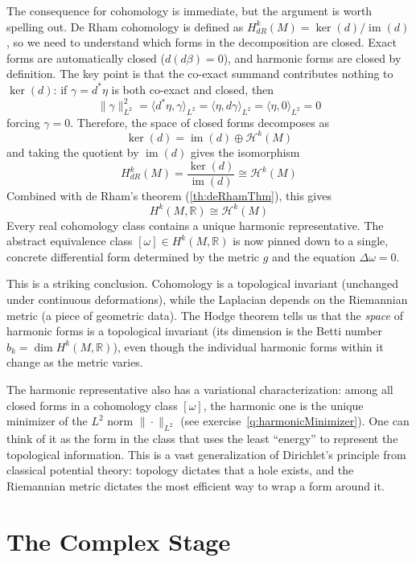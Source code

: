 \documentclass{article}
\newcommand{\R}{\mathbb{R}}
\newcommand{\CH}{\mathcal{H}}
\newcommand{\im}{\operatorname{im}}
\begin{document}
The consequence for cohomology is immediate, but the argument is worth spelling
out. De Rham cohomology is defined as $H^k_{dR}(M) = \ker(d) / \im(d)$, so we
need to understand which forms in the decomposition are closed. Exact forms are
automatically closed ($d(d\beta) = 0$), and harmonic forms are closed by
definition. The key point is that the co-exact summand contributes nothing to
$\ker(d)$: if $\gamma = d^*\eta$ is both co-exact and closed, then
\[
  \|\gamma\|^2_{L^2}
    = \langle d^*\eta, \gamma \rangle_{L^2}
    = \langle \eta, d\gamma \rangle_{L^2}
    = \langle \eta, 0 \rangle_{L^2} = 0
\]
forcing $\gamma = 0$. Therefore, the space of closed forms decomposes as
\[
  \ker(d) = \im(d) \oplus \CH^k(M)
\]
and taking the quotient by $\im(d)$ gives the isomorphism
\[
  H^k_{dR}(M) = \frac{\ker(d)}{\im(d)} \cong \CH^k(M)
\]
Combined with de Rham's theorem (\ref{th:deRhamThm}), this gives
\begin{equation}\label{eq:realHodgeDecomp}
  \boxed{H^k(M, \R) \cong \CH^k(M)}
\end{equation}
Every real cohomology class contains a unique harmonic representative. The
abstract equivalence class $[\omega] \in H^k(M, \R)$ is now pinned down to a
single, concrete differential form determined by the metric $g$ and the
equation $\Delta\omega = 0$.

This is a striking conclusion. Cohomology is a topological invariant (unchanged
under continuous deformations), while the Laplacian depends on the Riemannian
metric (a piece of geometric data). The Hodge theorem tells us that the
\emph{space} of harmonic forms is a topological invariant (its dimension is the
Betti number $b_k = \dim H^k(M, \R)$), even though the individual harmonic
forms within it change as the metric varies.

The harmonic representative also has a variational characterization: among all
closed forms in a cohomology class $[\omega]$, the harmonic one is the unique
minimizer of the $L^2$ norm $\|\cdot\|_{L^2}$
(see exercise~\ref{q:harmonicMinimizer}). One can think of it as the form in
the class that uses the least ``energy'' to represent the topological
information. This is a vast generalization of Dirichlet's principle from
classical potential theory: topology dictates that a hole exists, and the
Riemannian metric dictates the most efficient way to wrap a form around it.


\section{The Complex Stage}\label{sec:complex}
\end{document}
